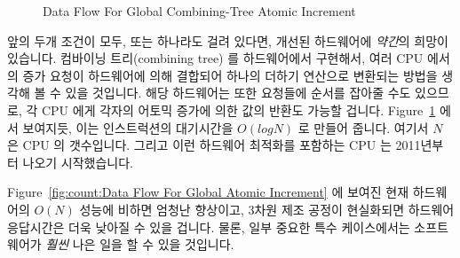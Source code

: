 {\begin{figure}[tb]
\centering
{}
\caption{Data Flow For Global Combining-Tree Atomic Increment}
\label{fig:count:Data Flow For Global Combining-Tree Atomic Increment}
\end{figure}

	앞의 두개 조건이 모두, 또는 하나라도 걸려 있다면, 개선된 하드웨어에
	\emph{약간}의 희망이 있습니다.
	컴바이닝 트리(combining tree) 를 하드웨어에서 구현해서, 여러 CPU 에서의
	증가 요청이 하드웨어에 의해 결합되어 하나의 더하기 연산으로 변환되는
	방법을 생각해 볼 수 있을 것입니다.
	해당 하드웨어는 또한 요청들에 순서를 잡아줄 수도 있으므로, 각 CPU 에게
	각자의 어토믹 증가에 의한 값의 반환도 가능할 겁니다.
	Figure~\ref{fig:count:Data Flow For Global Combining-Tree Atomic Increment}
	에서 보여지듯, 이는 인스트럭션의 대기시간을 $O(log N)$ 로 만들어
	줍니다. 여기서 $N$ 은 CPU 의 갯수입니다.
	그리고 이런 하드웨어 최적화를 포함하는 CPU 는 2011년부터 나오기
	시작했습니다.

	Figure~\ref{fig:count:Data Flow For Global Atomic Increment} 에 보여진
	현재 하드웨어의 $O(N)$ 성능에 비하면 엄청난 향상이고, 3차원 제조 공정이
	현실화되면 하드웨어 응답시간은 더욱 낮아질 수 있을 겁니다.
	물론, 일부 중요한 특수 케이스에서는 소프트웨어가 \emph{훨씬} 나은 일을
	할 수 있을 것입니다.

} \QuickQuizEnd


